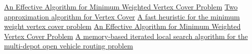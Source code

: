 \documentclass[11pt]{article}
\begin{document}
\begin{thebibliography}{5}

 \href{https://www.researchgate.net/publication/242463011_An_Effective_Algorithm_for_Minimum_Weighted_Vertex_Cover_problem}{An Effective Algorithm for Minimum Weighted Vertex Cover Problem}
 \href{https://www.cs.umd.edu/class/fall2018/cmsc858E/pdfs/651/vc.pdf} {Two approximation algorithm for Vertex Cover} 
 \href{https://ieeexplore.ieee.org/abstract/document/7550782}{A fast heuristic for the minimum weight vertex cover problem}
 \href{https://www.researchgate.net/publication/242463011_An_Effective_Algorithm_for_Minimum_Weighted_Vertex_Cover_problem}{An Effective Algorithm for Minimum Weighted Vertex Cover Problem}
 \href{https://www.sciencedirect.com/science/article/abs/pii/S0377221720300278}{A memory-based iterated local search algorithm for the multi-depot open vehicle routing problem}

\end{thebibliography}


\pagebreak
\end{document}
